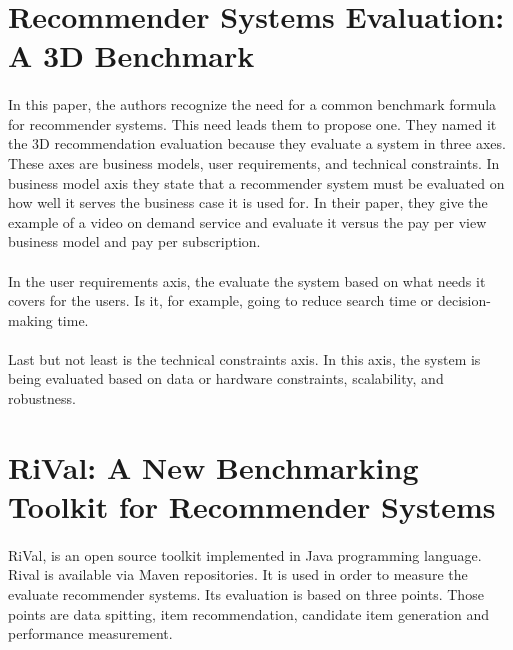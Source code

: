 \section{Recommender Systems Evaluation: A 3D Benchmark \cite{said2012recommender}}
\paragraph{}In this paper, the authors recognize the need for a common benchmark formula for recommender systems. This need leads them to propose one. They named it the 3D recommendation evaluation because they evaluate a system in three axes. These axes are business models, user requirements, and technical constraints. In business model axis they state that a recommender system must be evaluated on how well it serves the business case it is used for. In their paper, they give the example of a video on demand service and evaluate it versus the pay per view business model and pay per subscription.

\paragraph{}In the user requirements axis, the evaluate the system based on what needs it covers for the users. Is it, for example, going to reduce search time or decision-making time.

\paragraph{}Last but not least is the technical constraints axis. In this axis, the system is being evaluated based on data or hardware constraints, scalability, and robustness.

\section{RiVal: A New Benchmarking Toolkit for Recommender Systems \cite{said2014rival}}
\paragraph{} RiVal, is an open source toolkit implemented in Java programming language. Rival is available via Maven repositories. It is used in order to measure the evaluate recommender systems. Its evaluation is based on three points. Those points are data spitting, item recommendation, candidate item generation and performance measurement. 
